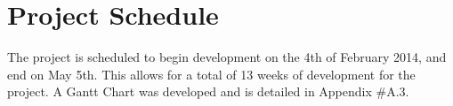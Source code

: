 \section{Project Schedule}
	The project is scheduled to begin development on the 4th of February 2014, and end on
	May 5th. This allows for a total of 13 weeks of development for the project. A Gantt Chart was
	developed and is detailed in Appendix #A.3.